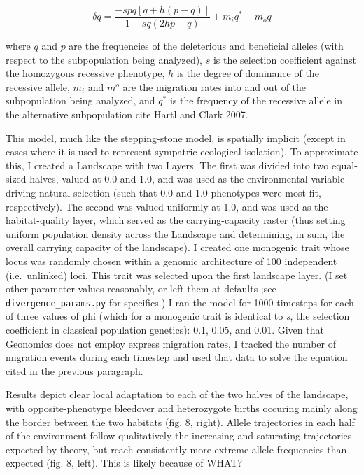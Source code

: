 ﻿\documentclass{article}
\begin{document}
\begin{equation}
\delta{q} = \frac{-spq[q + h(p - q)]}{1 - sq(2hp + q)} + m_{i}q^{*} - m_{o}q
\end{equation}

where $q$ and $p$ are the frequencies of the deleterious and beneficial
alleles (with respect to the subpopulation being analyzed), $s$ is the selection
coefficient against the homozygous recessive phenotype, $h$ is the degree of dominance
of the recessive allele, $m_{i}$ and $m^{o}$ are the migration rates into and out of
the subpopulation being analyzed, and $q^{*}$ is the frequency of the recessive allele
in the alternative subpopulation {\large cite Hartl and Clark 2007}.

This model, much like the stepping-stone model, is spatially implicit
(except in cases where it is used to represent sympatric ecological isolation).
To approximate this, I created a Landscape with two Layers. The first
was divided into two equal-sized halves, valued at 0.0 and 1.0, and was used
as the environmental variable driving natural selection (such that 0.0 and 1.0
phenotypes were most fit, respectively). The second was valued uniformly at 1.0,
and was used as the habitat-quality layer, which served as the carrying-capacity
raster (thus setting uniform population density across the Landscape and determining,
in sum, the overall carrying capacity of the landscape).
I created one monogenic trait whose locus was randomly chosen within a 
genomic architecture of 100 independent (i.e.\ unlinked) loci. This trait was selected
upon the first landscape layer.  (I set other parameter values reasonably, or left them
at defaults ;see \texttt{divergence\_params.py} for specifics.) I ran the model for 1000
timesteps for each of three values of phi (which for a monogenic trait is
identical to \emph{s}, the selection coefficient in classical population genetics): 
0.1, 0.05, and 0.01. Given that Geonomics does not employ express migration rates,
I tracked the number of migration events during each timestep and used that
data to solve the equation cited in the previous paragraph.

Results depict clear local adaptation to each of the two halves of the landscape,
with opposite-phenotype bleedover and heterozygote births occuring mainly along
the border between the two habitats (fig. 8, right).
Allele trajectories in each half of the
environment follow qualitatively the increasing and saturating trajectories expected by
theory, but reach consistently more extreme allele frequencies than expected (fig. 8,
left). This is likely because of WHAT?
\end{document}
